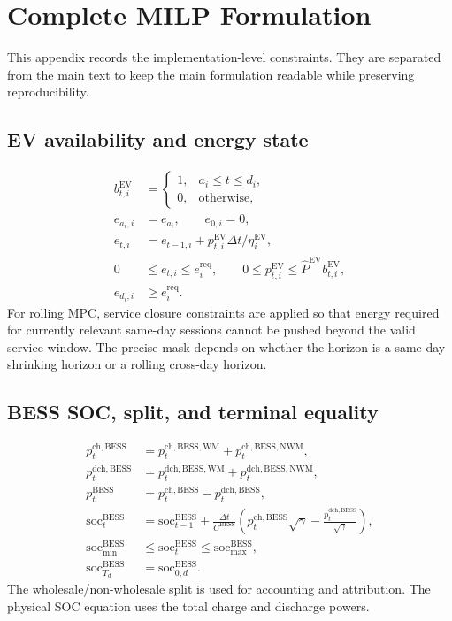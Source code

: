\documentclass[final,5p,times]{elsarticle}
\newcommand{\DeltaT}{\Delta t}
\newcommand{\EV}{\mathrm{EV}}
\newcommand{\BESS}{\mathrm{BESS}}
\newcommand{\soc}{\mathrm{soc}}
\newcommand{\WM}{\mathrm{WM}}
\newcommand{\NWM}{\mathrm{NWM}}
\newcommand{\ch}{\mathrm{ch}}
\newcommand{\dch}{\mathrm{dch}}
\newcommand{\req}{\mathrm{req}}
\begin{document}
\appendix
\section{Complete MILP Formulation}
\label{app:complete_milp}

This appendix records the implementation-level constraints. They are separated from the main text to keep the main formulation readable while preserving reproducibility.

\subsection{EV availability and energy state}
\begin{align}
b_{t,i}^{\EV} &= \begin{cases}1, & a_i\le t\le d_i,\\0, & \text{otherwise},\end{cases}\label{eq:app_ev_avail}\\
e_{a_i,i} &= e_{a_i},\qquad e_{0,i}=0,\label{eq:app_ev_init}\\
e_{t,i} &= e_{t-1,i}+p_{t,i}^{\EV}\DeltaT/\eta_i^{\EV},\label{eq:app_ev_dyn}\\
0&\le e_{t,i}\le e_i^{\req},\qquad
0\le p_{t,i}^{\EV}\le \hat P^{\EV}b_{t,i}^{\EV},\label{eq:app_ev_bounds}\\
e_{d_i,i}&\ge e_i^{\req}.\label{eq:app_ev_req}
\end{align}
For rolling MPC, service closure constraints are applied so that energy required for currently relevant same-day sessions cannot be pushed beyond the valid service window. The precise mask depends on whether the horizon is a same-day shrinking horizon or a rolling cross-day horizon.

\subsection{BESS SOC, split, and terminal equality}
\begin{align}
p_t^{\ch,\BESS}&=p_t^{\ch,\BESS,\WM}+p_t^{\ch,\BESS,\NWM},\label{eq:app_bess_chsplit}\\
p_t^{\dch,\BESS}&=p_t^{\dch,\BESS,\WM}+p_t^{\dch,\BESS,\NWM},\label{eq:app_bess_dchsplit}\\
p_t^{\BESS}&=p_t^{\ch,\BESS}-p_t^{\dch,\BESS},\label{eq:app_bess_power}\\
\soc_t^{\BESS}&=\soc_{t-1}^{\BESS}+\frac{\DeltaT}{C^{\BESS}}
\left(p_t^{\ch,\BESS}\sqrt{\gamma}-\frac{p_t^{\dch,\BESS}}{\sqrt{\gamma}}\right),\label{eq:app_bess_soc}\\
\soc_{\min}^{\BESS}&\le \soc_t^{\BESS}\le \soc_{\max}^{\BESS},\label{eq:app_bess_bounds}\\
\soc_{T_d}^{\BESS}&=\soc_{0,d}^{\BESS}.\label{eq:app_bess_terminal}
\end{align}
The wholesale/non-wholesale split is used for accounting and attribution. The physical SOC equation uses the total charge and discharge powers.
\end{document}
